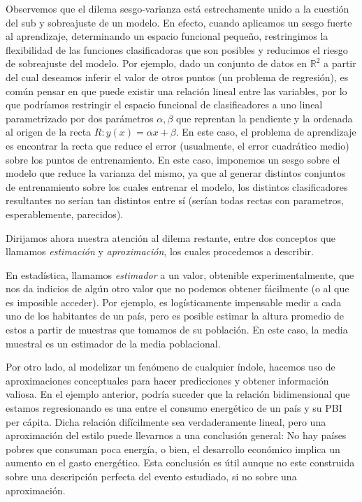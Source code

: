 \documentclass{report}
\begin{document}
Observemos que el dilema sesgo-varianza está estrechamente unido a la cuestión del sub y sobreajuste de un modelo. En efecto,
cuando aplicamos un sesgo fuerte al aprendizaje, determinando un espacio funcional pequeño, restringimos la flexibilidad de las
funciones clasificadoras que son posibles y reducimos el riesgo de sobreajuste del modelo. Por ejemplo, dado un conjunto
de datos en $\mathbb{R}^2$ a partir del cual deseamos inferir el valor de otros puntos (un problema de regresión), es común
pensar en que puede existir una relación lineal entre las variables, por lo que podríamos restringir el espacio funcional
de clasificadores a uno lineal parametrizado por dos parámetros $\alpha, \beta$ que reprentan la pendiente y la ordenada
al origen de la recta $R: y(x) = \alpha x + \beta$. En este caso, el problema de aprendizaje es encontrar la recta que reduce
el error (usualmente, el error cuadrático medio) sobre los puntos de entrenamiento. En este caso, imponemos un sesgo
sobre el modelo que reduce la varianza del mismo, ya que al generar distintos conjuntos de entrenamiento sobre los cuales
entrenar el modelo, los distintos clasificadores resultantes no serían tan distintos entre sí (serían todas rectas con parametros,
esperablemente, parecidos).


Dirijamos ahora nuestra atención al dilema restante, entre dos conceptos que llamamos \textit{estimación} y \textit{aproximación},
los cuales procedemos a describir.

En estadística, llamamos \textit{estimador} a un valor, obtenible experimentalmente, que nos da indicios
de algún otro valor que no podemos obtener fácilmente (o al que es imposible acceder). Por ejemplo, es logísticamente impensable
medir a cada uno de los habitantes de un país, pero es posible estimar la altura promedio de estos a partir de muestras que tomamos
de su población. En este caso, la media muestral es un estimador de la media poblacional.

Por otro lado, al modelizar un fenómeno de cualquier índole, hacemos uso de aproximaciones conceptuales para
hacer predicciones y obtener información valiosa. En el ejemplo anterior, podría suceder que la relación bidimensional que estamos
regresionando es una entre el consumo energético de un país y su PBI per cápita. Dicha relación difícilmente sea verdaderamente lineal,
pero una aproximación del estilo puede llevarnos a una conclusión general: No hay países pobres que consuman poca energía, o bien,
el desarrollo económico implica un aumento en el gasto energético. Esta conclusión es útil aunque no este construida sobre una descripción
perfecta del evento estudiado, si no sobre una aproximación.
\end{document}
